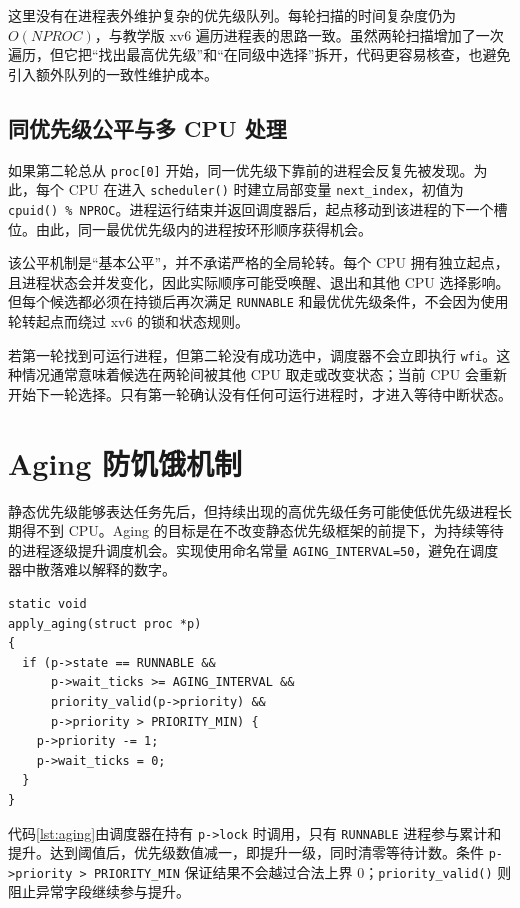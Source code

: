 这里没有在进程表外维护复杂的优先级队列。每轮扫描的时间复杂度仍为 $O(NPROC)$，与教学版 xv6 遍历进程表的思路一致。虽然两轮扫描增加了一次遍历，但它把“找出最高优先级”和“在同级中选择”拆开，代码更容易核查，也避免引入额外队列的一致性维护成本。

\subsection{同优先级公平与多 CPU 处理}

如果第二轮总从 \texttt{proc[0]} 开始，同一优先级下靠前的进程会反复先被发现。为此，每个 CPU 在进入 \texttt{scheduler()} 时建立局部变量 \texttt{next\_index}，初值为 \texttt{cpuid() \% NPROC}。进程运行结束并返回调度器后，起点移动到该进程的下一个槽位。由此，同一最优优先级内的进程按环形顺序获得机会。

该公平机制是“基本公平”，并不承诺严格的全局轮转。每个 CPU 拥有独立起点，且进程状态会并发变化，因此实际顺序可能受唤醒、退出和其他 CPU 选择影响。但每个候选都必须在持锁后再次满足 \texttt{RUNNABLE} 和最优优先级条件，不会因为使用轮转起点而绕过 xv6 的锁和状态规则。

若第一轮找到可运行进程，但第二轮没有成功选中，调度器不会立即执行 \texttt{wfi}。这种情况通常意味着候选在两轮间被其他 CPU 取走或改变状态；当前 CPU 会重新开始下一轮选择。只有第一轮确认没有任何可运行进程时，才进入等待中断状态。

\section{Aging 防饥饿机制}

静态优先级能够表达任务先后，但持续出现的高优先级任务可能使低优先级进程长期得不到 CPU。Aging 的目标是在不改变静态优先级框架的前提下，为持续等待的进程逐级提升调度机会。实现使用命名常量 \texttt{AGING\_INTERVAL=50}，避免在调度器中散落难以解释的数字。

\begin{lstlisting}[caption={Aging 状态更新（\texttt{kernel/proc.c}）},label={lst:aging}]
static void
apply_aging(struct proc *p)
{
  if (p->state == RUNNABLE &&
      p->wait_ticks >= AGING_INTERVAL &&
      priority_valid(p->priority) &&
      p->priority > PRIORITY_MIN) {
    p->priority -= 1;
    p->wait_ticks = 0;
  }
}
\end{lstlisting}

代码\ref{lst:aging}由调度器在持有 \texttt{p->lock} 时调用，只有 \texttt{RUNNABLE} 进程参与累计和提升。达到阈值后，优先级数值减一，即提升一级，同时清零等待计数。条件 \texttt{p->priority > PRIORITY\_MIN} 保证结果不会越过合法上界 0；\texttt{priority\_valid()} 则阻止异常字段继续参与提升。

